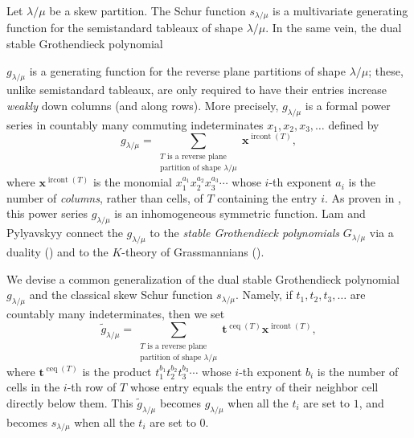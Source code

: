 \documentclass[numbers=enddot,12pt,final,onecolumn,notitlepage]{scrartcl}%
\theoremstyle{definition}
\let\sumnonlimits\sum
\renewcommand{\sum}{\sumnonlimits\limits}
\begin{document}
Let $\lambda/\mu$ be a skew partition. The Schur function $s_{\lambda/\mu}$ is
a multivariate generating function for the semistandard tableaux of shape
$\lambda/\mu$. In the same vein, the dual stable Grothendieck
polynomial 
\begin{comment}
\footnote{The word \textquotedblleft polynomial\textquotedblright%
\ is a stretch: $g_{\lambda/\mu}$ is a bounded-degree power series in
infinitely many indeterminates (like $s_{\lambda/\mu}$).} 
\end{comment}
$g_{\lambda/\mu}$ is
a generating function for the reverse plane partitions of shape $\lambda/\mu$;
these, unlike semistandard tableaux, are only required to have their entries
increase \textit{weakly} down columns (and along rows). More precisely,
$g_{\lambda/\mu}$ is a formal power series in countably many commuting
indeterminates $x_{1},x_{2},x_{3},\ldots$ defined by
\[
g_{\lambda/\mu}=\sum_{\substack{T\text{ is a reverse plane}\\\text{partition
of shape }\lambda/\mu}}\mathbf{x}^{\operatorname*{ircont}\left(  T\right)  },
\]
where $\mathbf{x}^{\operatorname*{ircont}\left(  T\right)  }$ is the monomial
$x_{1}^{a_{1}}x_{2}^{a_{2}}x_{3}^{a_{3}}\cdots$ whose $i$-th exponent $a_{i}$
is the number of \textit{columns}, rather than cells, %
of $T$ containing the entry $i$. As proven in
\cite[\S 9.1]{LamPyl}, this power series $g_{\lambda/\mu}$ is an inhomogeneous symmetric
function. Lam and Pylyavskyy connect the $g_{\lambda/\mu}$ to the
\textit{stable Grothendieck polynomials} $G_{\lambda/\mu}$ via a duality
(\cite[\S 9.4]{LamPyl}) and to the $K$-theory of
Grassmannians (\cite[\S 9.5]{LamPyl}).

We devise a common generalization of the dual stable Grothendieck polynomial
$g_{\lambda/\mu}$ and the classical skew Schur function $s_{\lambda/\mu}$.
Namely, if $t_{1},t_{2},t_{3},\ldots$ are countably many indeterminates, then we
set%
\[
\widetilde{g}_{\lambda/\mu}=\sum_{\substack{T\text{ is a reverse
plane}\\\text{partition of shape }\lambda/\mu}}\mathbf{t}^{\operatorname*{ceq}%
\left(  T\right)  }\mathbf{x}^{\operatorname*{ircont}\left(  T\right)  },
\]
where $\mathbf{t}^{\operatorname*{ceq}\left(  T\right)  }$ is the product
$t_{1}^{b_{1}}t_{2}^{b_{2}}t_{3}^{b_{3}}\cdots$ whose $i$-th exponent $b_{i}$
is the number of cells in the $i$-th row of $T$ whose entry equals the entry
of their neighbor cell directly below them. This $\widetilde{g}_{\lambda/\mu}$
becomes $g_{\lambda/\mu}$ when all the $t_{i}$ are set to $1$, and becomes
$s_{\lambda/\mu}$ when all the $t_{i}$ are set to $0$.
\end{document}
